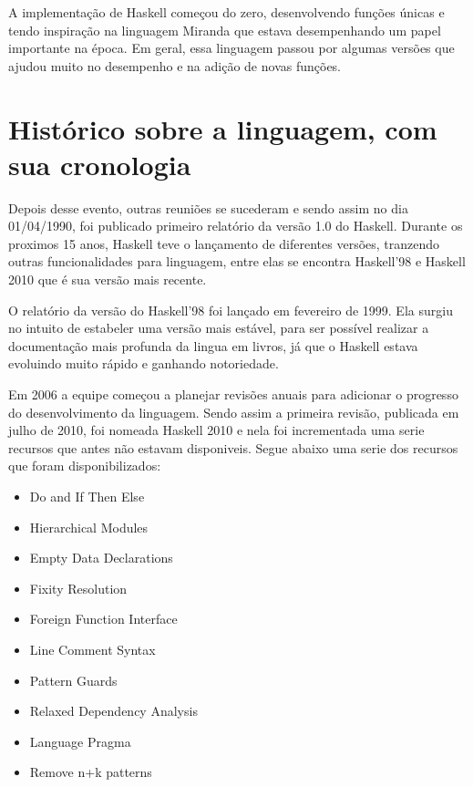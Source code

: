 \documentclass[
  12pt,				         %
  oneside,			       %
  a4paper,			       %
  english,		       	 %
  brazil,			      	 %
]{abntex2}
\begin{document}
    A implementação de Haskell começou do zero, desenvolvendo funções únicas e tendo inspiração na linguagem Miranda que estava desempenhando um papel 
    importante na época. Em geral, essa linguagem passou por algumas versões que ajudou muito no desempenho e na adição de novas funções. 

    \newpage
    \chapter{Histórico sobre a linguagem, com sua cronologia}

    Depois desse evento, outras reuniões se sucederam e sendo assim no dia 01/04/1990, foi publicado primeiro relatório
    da versão 1.0 do Haskell. Durante os proximos 15 anos, Haskell teve o lançamento de diferentes versões, tranzendo outras
    funcionalidades para linguagem, entre elas se encontra Haskell'98 e Haskell 2010 que é sua versão mais recente.  

    O relatório da versão do Haskell'98 foi lançado em fevereiro de 1999. Ela surgiu no intuito de estabeler uma versão mais estável, 
    para ser possível realizar a documentação mais profunda da lingua em livros, já que o Haskell estava evoluindo muito rápido e ganhando 
    notoriedade.

    Em 2006 a equipe começou a planejar revisões anuais para adicionar o progresso do desenvolvimento da linguagem. Sendo assim a primeira revisão,
    publicada em julho de 2010, foi nomeada Haskell 2010 e nela foi incrementada uma serie recursos que antes não estavam disponiveis.
    Segue abaixo uma serie dos recursos que foram disponibilizados:
    
    \begin{itemize}
      \item Do and If Then Else 
      \item Hierarchical Modules
      \item Empty Data Declarations
      \item Fixity Resolution 
      \item Foreign Function Interface
      \item Line Comment Syntax
      \item Pattern Guards
      \item Relaxed Dependency Analysis
      \item Language Pragma
      \item Remove n+k patterns
    \end{itemize}
\end{document}
